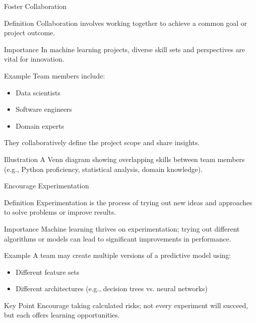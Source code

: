\documentclass[aspectratio=169]{beamer}
\begin{document}
\begin{frame}[fragile]{Foster Collaboration}
    \begin{block}{Definition}
        Collaboration involves working together to achieve a common goal or project outcome.
    \end{block}

    \begin{block}{Importance}
        In machine learning projects, diverse skill sets and perspectives are vital for innovation.
    \end{block}

    \begin{block}{Example}
        Team members include:
        \begin{itemize}
            \item Data scientists
            \item Software engineers
            \item Domain experts
        \end{itemize}
        They collaboratively define the project scope and share insights.
    \end{block}
    
    \begin{block}{Illustration}
        A Venn diagram showing overlapping skills between team members (e.g., Python proficiency, statistical analysis, domain knowledge).
    \end{block}
\end{frame}

\begin{frame}[fragile]{Encourage Experimentation}
    \begin{block}{Definition}
        Experimentation is the process of trying out new ideas and approaches to solve problems or improve results.
    \end{block}

    \begin{block}{Importance}
        Machine learning thrives on experimentation; trying out different algorithms or models can lead to significant improvements in performance.
    \end{block}

    \begin{block}{Example}
        A team may create multiple versions of a predictive model using:
        \begin{itemize}
            \item Different feature sets
            \item Different architectures (e.g., decision trees vs. neural networks)
        \end{itemize}
    \end{block}
    
    \begin{block}{Key Point}
        Encourage taking calculated risks; not every experiment will succeed, but each offers learning opportunities.
    \end{block}
\end{frame}
\end{document}
